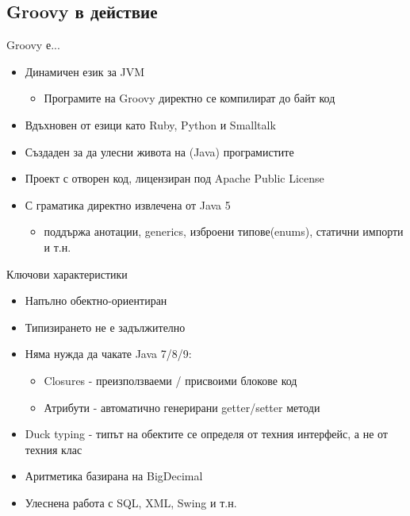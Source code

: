 \documentclass[compress,red]{beamer}
\begin{document}
\subsection{Groovy в действие}

\begin{frame}{Groovy е...}
  \transdissolve
  \begin{itemize}
  \item Динамичен език за JVM
    \begin{itemize}
      \item Програмите на Groovy директно се компилират до байт код
    \end{itemize}

  \item Вдъхновен от езици като Ruby, Python и Smalltalk
  \item Създаден за да улесни живота на (Java) програмистите
  \item Проект с отворен код, лицензиран под Apache Public License
  \item С граматика директно извлечена от Java 5
    \begin{itemize}
      \item поддържа анотации, generics, изброени типове(enums),
        статични импорти и т.н.
    \end{itemize}

  \end{itemize}
\end{frame}

\begin{frame}{Ключови характеристики}
  \transdissolve
  \begin{itemize}
  \item Напълно обектно-ориентиран
  \item Типизирането не е задължително
  \item Няма нужда да чакате Java 7/8/9:
    \begin{itemize}
      \item Closures - преизползваеми / присвоими блокове код
      \item Атрибути - автоматично генерирани getter/setter методи
    \end{itemize}
  \item Duck typing - типът на обектите се определя от техния
    интерфейс, а не от техния клас
  \item Аритметика базирана на BigDecimal
  \item Улеснена работа с SQL, XML, Swing и т.н.
  \end{itemize}
\end{frame}
\end{document}
